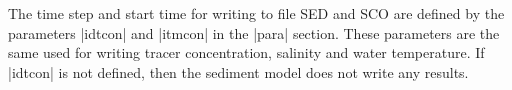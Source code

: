 The time step and start time for writing to file SED and SCO
are defined by the parameters |idtcon| and |itmcon| in the |para|
section. These parameters are the same used for writing tracer
concentration, salinity and water temperature. If |idtcon| is not
defined, then the sediment model does not write any results.


